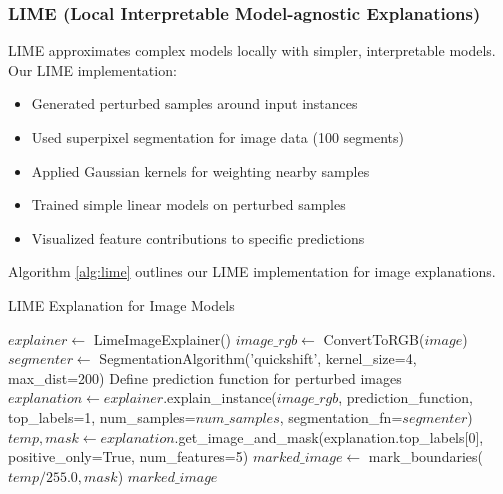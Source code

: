 \documentclass[conference,compsoc]{IEEEtran}
\begin{document}
\subsubsection{LIME (Local Interpretable Model-agnostic Explanations)}
LIME approximates complex models locally with simpler, interpretable models. Our LIME implementation:
\begin{itemize}
    \item Generated perturbed samples around input instances
    \item Used superpixel segmentation for image data (100 segments)
    \item Applied Gaussian kernels for weighting nearby samples
    \item Trained simple linear models on perturbed samples
    \item Visualized feature contributions to specific predictions
\end{itemize}

Algorithm \ref{alg:lime} outlines our LIME implementation for image explanations.

\begin{algorithm}
\caption{LIME Explanation for Image Models}
\label{alg:lime}
\begin{algorithmic}[1]
    \State $explainer \gets$ LimeImageExplainer()
    \State $image\_rgb \gets$ ConvertToRGB($image$)
    \State $segmenter \gets$ SegmentationAlgorithm('quickshift', kernel\_size=4, max\_dist=200)
    \State Define prediction function for perturbed images
    \State $explanation \gets explainer$.explain\_instance($image\_rgb$, prediction\_function, 
                                               top\_labels=1, num\_samples=$num\_samples$,
                                               segmentation\_fn=$segmenter$)
    \State $temp, mask \gets explanation$.get\_image\_and\_mask(explanation.top\_labels[0],
                                                     positive\_only=True, num\_features=5)
    \State $marked\_image \gets$ mark\_boundaries($temp / 255.0, mask$)
    \State \Return $marked\_image$
\EndFunction
\end{algorithmic}
\end{algorithm}
\end{document}
